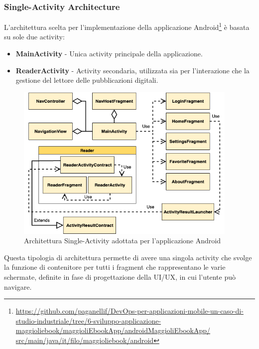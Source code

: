 \subsubsection*{Single-Activity Architecture}
L'architettura scelta per l'implementazione della applicazione Android\footnote{\href{https://github.com/paganellif/DevOps-per-applicazioni-mobile-un-caso-di-studio-industriale/tree/6-sviluppo-applicazione-maggioliebook/maggioliEbookApp/androidMaggioliEbookApp/src/main/java/it/filo/maggioliebook/android}{https://github.com/paganellif/DevOps-per-applicazioni-mobile-un-caso-di-studio-industriale/tree/6-sviluppo-applicazione-maggioliebook/maggioliEbookApp/androidMaggioliEbookApp/\\src/main/java/it/filo/maggioliebook/android}} è basata su sole due activity:

\begin{itemize}
    \item \textbf{MainActivity} - Unica activity principale della applicazione.
    \item \textbf{ReaderActivity} - Activity secondaria, utilizzata sia per l'interazione che la gestione del lettore delle pubblicazioni digitali.
\end{itemize}

\begin{figure}[H]
    \centering
    \includegraphics[width=0.95\textwidth]{img/android-arch.png}
    \caption{Architettura Single-Activity adottata per l'applicazione Android}
    \label{android-arch-png}
\end{figure}

Questa tipologia di architettura permette di avere una singola activity che svolge la funzione di contenitore per tutti i fragment che rappresentano le varie schermate, definite in fase di progettazione della UI/UX, in cui l'utente può navigare.

